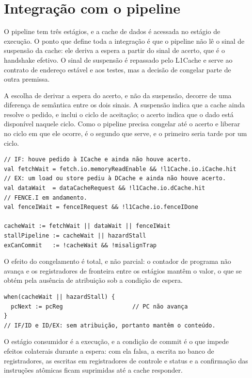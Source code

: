 \section{Integração com o pipeline}\label{sec:5.7}

O pipeline tem três estágios, e a cache de dados é acessada no estágio de execução. O ponto que define toda a integração é que o pipeline não lê o sinal de suspensão da cache: ele deriva a espera a partir do sinal de acerto, que é o handshake efetivo. O sinal de suspensão é repassado pelo L1Cache e serve ao contrato de endereço estável e aos testes, mas a decisão de congelar parte de outra premissa.

A escolha de derivar a espera do acerto, e não da suspensão, decorre de uma diferença de semântica entre os dois sinais. A suspensão indica que a cache ainda resolve o pedido, e inclui o ciclo de aceitação; o acerto indica que o dado está disponível naquele ciclo. Como o pipeline precisa congelar até o acerto e liberar no ciclo em que ele ocorre, é o segundo que serve, e o primeiro seria tarde por um ciclo.


{\footnotesize
\begin{verbatim}
// IF: houve pedido à ICache e ainda não houve acerto.
val fetchWait = fetch.io.memoryReadEnable && !l1Cache.io.iCache.hit
// EX: um load ou store pediu à DCache e ainda não houve acerto.
val dataWait  = dataCacheRequest && !l1Cache.io.dCache.hit
// FENCE.I em andamento.
val fenceIWait = fenceIRequest && !l1Cache.io.fenceIDone

cacheWait := fetchWait || dataWait || fenceIWait
stallPipeline := cacheWait || hazardStall
exCanCommit   := !cacheWait && !misalignTrap
\end{verbatim}
}


O efeito do congelamento é total, e não parcial: o contador de programa não avança e os registradores de fronteira entre os estágios mantêm o valor, o que se obtém pela ausência de atribuição sob a condição de espera.


{\footnotesize
\begin{verbatim}
when(cacheWait || hazardStall) {
  pcNext := pcReg                    // PC não avança
}
// IF/ID e ID/EX: sem atribuição, portanto mantêm o conteúdo.
\end{verbatim}
}


O estágio consumidor é a execução, e a condição de commit é o que impede efeitos colaterais durante a espera: com ela falsa, a escrita no banco de registradores, as escritas em registradores de controle e status e a confirmação das instruções atômicas ficam suprimidas até a cache responder.


